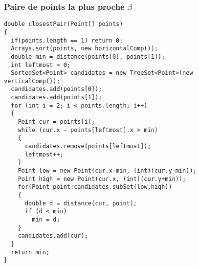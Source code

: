\subsubsection[Paire de points la plus proche]{Paire de points la plus proche  $\beta$}
\begin{lstlisting}
double closestPair(Point[] points)
{
  if(points.length == 1) return 0;
  Arrays.sort(points, new horizontalComp());
  double min = distance(points[0], points[1]);
  int leftmost = 0;
  SortedSet<Point> candidates = new TreeSet<Point>(new verticalComp());  
  candidates.add(points[0]);
  candidates.add(points[1]);
  for (int i = 2; i < points.length; i++)
  {
    Point cur = points[i];
    while (cur.x - points[leftmost].x > min)
    {
      candidates.remove(points[leftmost]);
      leftmost++;
    }
    Point low = new Point(cur.x-min, (int)(cur.y-min));
    Point high = new Point(cur.x, (int)(cur.y+min));
    for(Point point:candidates.subSet(low,high))
    {
      double d = distance(cur, point);
      if (d < min)
        min = d;
    }
    candidates.add(cur);
  }
  return min;
}
\end{lstlisting}
